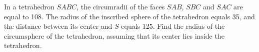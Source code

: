 \problem
In a tetrahedron $SABC$, the circumradii of the faces $SAB$, $SBC$ and $SAC$
are equal to 108.
The radius of the inscribed sphere of the tetrahedron equals 35, and the
distance between its center and $S$ equals 125.
Find the radius of the circumsphere of the tetrahedron, assuming that its
center lies inside the tetrahedron.
\solution
\endproblem
